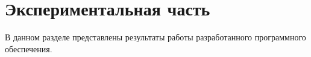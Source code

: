 \section{Экспериментальная часть}
В  данном  разделе  представлены  результаты  работы  разработанного 
программного обеспечения.

\pagebreak